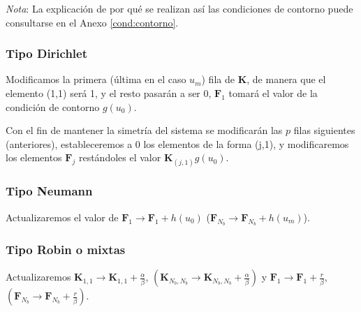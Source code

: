 \documentclass[11pt]{book}
\theoremstyle{plain} %
\theoremstyle{definition} %
\theoremstyle{definition} %
\begin{document}
\begin{flushleft}
    \small{\textit{Nota}: La explicación de por qué se realizan así las condiciones de contorno puede consultarse en el Anexo \ref{cond:contorno}.}
\end{flushleft}

\subsubsection{Tipo Dirichlet}

\vspace{-0.2cm}

Modificamos la primera (última en el caso $u_m$) fila de $\mathbf{K}$, de manera que el elemento (1,1) será 1, y el resto pasarán a ser 0, $\mathbf{F}_1$ tomará el valor de la condición de contorno $g(u_0)$.

Con el fin de mantener la simetría del sistema se modificarán las $p$ filas siguientes (anteriores), estableceremos a 0 los elementos de la forma (j,1), y modificaremos los elementos $\mathbf{F}_j$ restándoles el valor $\mathbf{K}_{(j,1)}g(u_0)$.

\vspace{-0.35cm}

\subsubsection{Tipo Neumann}

\vspace{-0.2cm}

Actualizaremos el valor de $\mathbf{F}_1\rightarrow \mathbf{F}_1+h(u_0)$  ($\mathbf{F}_{N_b} \rightarrow \mathbf{F}_{N_b}+h(u_m)$).

\vspace{-0.35cm}

\subsubsection{Tipo Robin o mixtas}

\vspace{-0.2cm}

Actualizaremos $\mathbf{K}_{1,1}\rightarrow \mathbf{K}_{1,1} + \frac{\alpha}{\beta}$, $\left( \mathbf{K}_{N_b,N_b}\rightarrow \mathbf{K}_{N_b,N_b} + \frac{\alpha}{\beta}\right)$ y $\mathbf{F}_1 \rightarrow \mathbf{F}_1 + \frac{r}{\beta}$, $\left( \mathbf{F}_{N_b} \rightarrow \mathbf{F}_{N_b} + \frac{r}{\beta} \right)$.

\vspace{-0.35cm}
\end{document}
